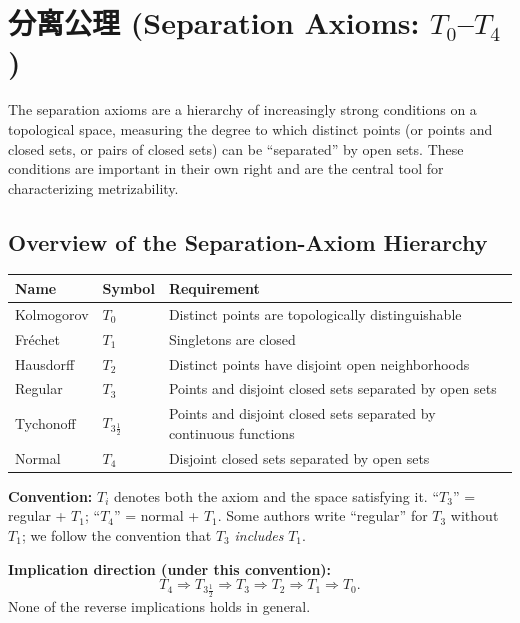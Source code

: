 \documentclass{article}
\begin{document}
\section{分离公理 (Separation Axioms: $T_0$--$T_4$)}

The separation axioms are a hierarchy of increasingly strong conditions on a
topological space, measuring the degree to which distinct points (or points and
closed sets, or pairs of closed sets) can be ``separated'' by open sets.  These
conditions are important in their own right and are the central tool for
characterizing metrizability.

\subsection{Overview of the Separation-Axiom Hierarchy}

\begin{center}
  \begin{tabular}{lll}
    \textbf{Name} & \textbf{Symbol} & \textbf{Requirement} \\
    \hline
    Kolmogorov   & $T_0$     & Distinct points are topologically
    distinguishable \\
    Fr\'echet    & $T_1$     & Singletons are closed \\
    Hausdorff    & $T_2$     & Distinct points have disjoint open
    neighborhoods \\
    Regular      & $T_3$     & Points and disjoint closed sets
    separated by open sets \\
    Tychonoff    & $T_{3\frac{1}{2}}$ & Points and disjoint closed
    sets separated by continuous functions \\
    Normal       & $T_4$     & Disjoint closed sets separated by open sets \\
  \end{tabular}
\end{center}

\textbf{Convention:} $T_i$ denotes both the axiom and the space satisfying it.
``$T_3$'' = regular + $T_1$; ``$T_4$'' = normal + $T_1$. Some authors write
``regular'' for $T_3$ without $T_1$; we follow the convention that
$T_3$ \emph{includes} $T_1$.

\textbf{Implication direction (under this convention):}
\[
  T_4 \Longrightarrow T_{3\frac{1}{2}} \Longrightarrow T_3
  \Longrightarrow T_2 \Longrightarrow T_1 \Longrightarrow T_0.
\]
None of the reverse implications holds in general.
\end{document}
